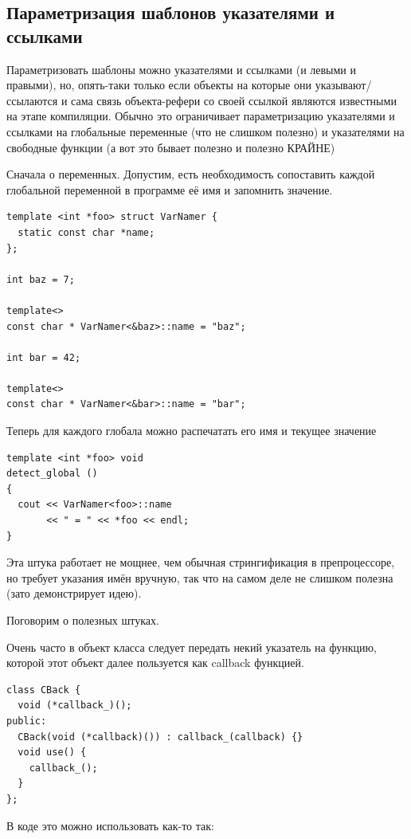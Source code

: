 \documentclass[a4paper,12pt,oneside]{book}
\begin{document}
\subsection{Параметризация шаблонов указателями и ссылками}\label{PointerTemplateArguments}

Параметризовать шаблоны можно указателями и ссылками (и левыми и правыми), но, опять-таки только если объекты на которые они указывают/ссылаются и сама связь объекта-рефери со своей ссылкой являются известными на этапе компиляции. Обычно это ограничивает параметризацию указателями и ссылками на глобальные переменные (что не слишком полезно) и указателями на свободные функции (а вот это бывает полезно и полезно КРАЙНЕ)

Сначала о переменных. Допустим, есть необходимость сопоставить каждой глобальной переменной в программе её имя и запомнить значение.

\begin{lstlisting}
template <int *foo> struct VarNamer {
  static const char *name;
};

int baz = 7;

template<>
const char * VarNamer<&baz>::name = "baz";

int bar = 42;

template<>
const char * VarNamer<&bar>::name = "bar";
\end{lstlisting}

Теперь для каждого глобала можно распечатать его имя и текущее значение

\begin{lstlisting}
template <int *foo> void
detect_global ()
{
  cout << VarNamer<foo>::name
       << " = " << *foo << endl;
}
\end{lstlisting}

Эта штука работает не мощнее, чем обычная стрингификация в препроцессоре, но требует указания имён вручную, так что на самом деле не слишком полезна (зато демонстрирует идею).

Поговорим о полезных штуках.

Очень часто в объект класса следует передать некий указатель на функцию, которой этот объект далее пользуется как callback функцией.

\begin{lstlisting}
class CBack {
  void (*callback_)();
public:
  CBack(void (*callback)()) : callback_(callback) {}
  void use() {
    callback_();
  }
}; 
\end{lstlisting}

В коде это можно использовать как-то так:
\end{document}
